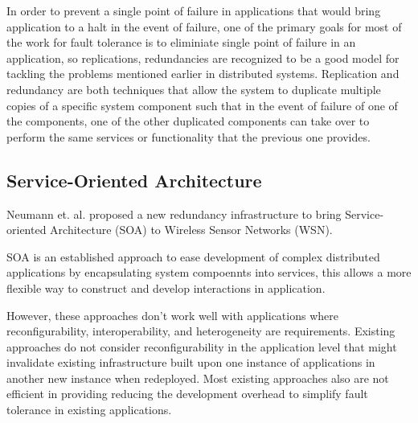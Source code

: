In order to prevent a single point of failure in applications that would bring
application to a halt in the event of failure, 
one of the primary goals for most of the work for fault tolerance is to
eliminiate single
point of failure in an application, so replications, redundancies are
recognized to be a good model for tackling the problems mentioned earlier in
distributed systems.
Replication and redundancy are both techniques that allow the system to
duplicate multiple copies of a specific system component such that in the
event of failure of one of the components, one of the other duplicated
components can take over to perform the same services or functionality that the
previous one provides.

\subsection{Service-Oriented Architecture}

Neumann et. al.\cite{Neumann2010} proposed a new redundancy infrastructure to
bring Service-oriented Architecture (SOA) to Wireless Sensor Networks (WSN).

SOA is an established approach to ease development of complex distributed
applications by encapsulating system compoennts into services, this allows a more
flexible way to construct and develop interactions in application.

However, these approaches don't work well with applications where
reconfigurability, interoperability, and heterogeneity are requirements.
Existing approaches do not consider reconfigurability in the
application level that might invalidate existing infrastructure built upon one
instance of applications in another new instance when redeployed.
Most existing approaches also are not efficient in providing reducing the
development overhead to simplify fault tolerance in existing applications.
